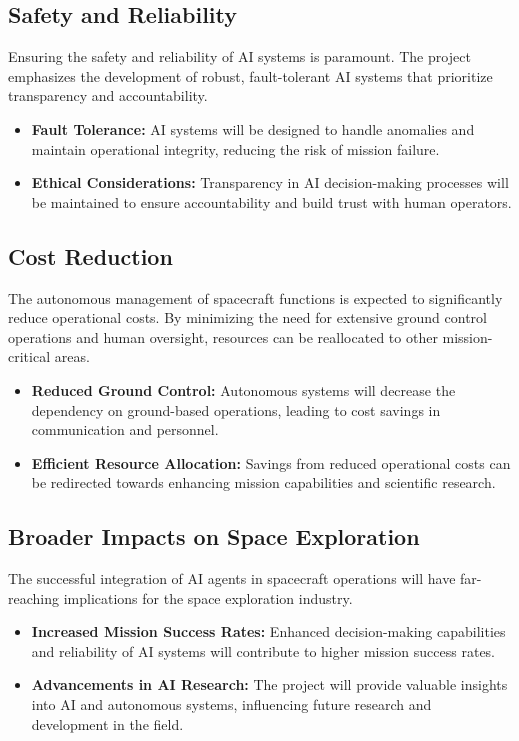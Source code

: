 \documentclass[a4paper,12pt]{article}
\begin{document}
\subsection{Safety and Reliability}

Ensuring the safety and reliability of AI systems is paramount. The project emphasizes the development of robust, fault-tolerant AI systems that prioritize transparency and accountability. 

\begin{itemize}
    \item \textbf{Fault Tolerance:} AI systems will be designed to handle anomalies and maintain operational integrity, reducing the risk of mission failure.
    \item \textbf{Ethical Considerations:} Transparency in AI decision-making processes will be maintained to ensure accountability and build trust with human operators.
\end{itemize}

\subsection{Cost Reduction}

The autonomous management of spacecraft functions is expected to significantly reduce operational costs. By minimizing the need for extensive ground control operations and human oversight, resources can be reallocated to other mission-critical areas.

\begin{itemize}
    \item \textbf{Reduced Ground Control:} Autonomous systems will decrease the dependency on ground-based operations, leading to cost savings in communication and personnel.
    \item \textbf{Efficient Resource Allocation:} Savings from reduced operational costs can be redirected towards enhancing mission capabilities and scientific research.
\end{itemize}

\subsection{Broader Impacts on Space Exploration}

The successful integration of AI agents in spacecraft operations will have far-reaching implications for the space exploration industry. 

\begin{itemize}
    \item \textbf{Increased Mission Success Rates:} Enhanced decision-making capabilities and reliability of AI systems will contribute to higher mission success rates.
    \item \textbf{Advancements in AI Research:} The project will provide valuable insights into AI and autonomous systems, influencing future research and development in the field.
\end{itemize}
\end{document}
